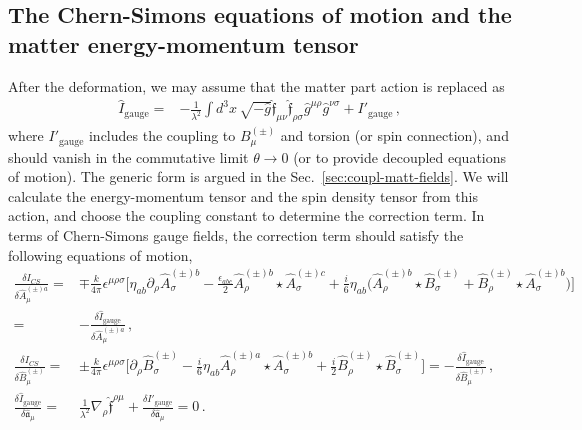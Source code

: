 \documentclass[11pt]{article}
\newcommand{\nn}{\nonumber}
\numberwithin{equation}{section}
\begin{document}
\subsection{The Chern-Simons equations of motion and the matter energy-momentum tensor}
\label{sec:matt-energy-moment}

After the deformation, we may assume that the matter part action is replaced as
\begin{align}
  \hat{I}_\text{gauge}=& 
-\frac{1}{\lambda^2} \int d^3 x\, \sqrt{-\hat{g}} \hat{\mathfrak{f}}_{\mu\nu} \hat{\mathfrak{f}}_{\rho\sigma} \hat{g}^{\mu\rho} \hat{g}^{\nu\sigma}
+ I'_\text{gauge} \,,
\end{align}
where $I'_\text{gauge}$ includes the coupling to $B_\mu^{(\pm)}$ and torsion (or spin connection),
and should vanish in the commutative limit $\theta \rightarrow 0$
(or to provide decoupled equations of motion).
The generic form is argued in the Sec.~\ref{sec:coupl-matt-fields}.
We will calculate the energy-momentum tensor and the spin density tensor from this action,
and choose the coupling constant to determine the correction term.
In terms of Chern-Simons gauge fields,
the correction term should satisfy the following equations of motion,
\begin{align}
    \frac{\delta I_{CS}}{\delta \hat{A}_\mu^{(\pm)a}}=&
\mp \frac{k}{4\pi} \epsilon^{\mu\rho\sigma}
\bigg[
\eta_{ab}\partial_\rho \hat{A}_\sigma^{(\pm)b}
-\frac{\epsilon_{abc}}{2}\hat{A}_\rho^{(\pm)b}  \star \hat{A}_\sigma^{(\pm)c}
+\frac{i}{6}\eta_{ab}\big( \hat{A}_\rho^{(\pm)b} \star \hat{B}_\sigma^{(\pm)} +
                                               \hat{B}_\rho^{(\pm)} \star \hat{A}_\sigma^{(\pm)b} \big)
 \bigg]
\nn\\=& -\frac{\delta \hat{I}_\text{gauge}}{\delta \hat{A}_\mu^{(\pm)a}} 
\label{eq:eqm_A_def0}
\,,\\
  \frac{\delta I_{CS}}{\delta \hat{B}_\mu^{(\pm)}}=&
\pm \frac{k}{4\pi} \epsilon^{\mu\rho\sigma} 
\bigg[
\partial_\rho \hat{B}_\sigma^{(\pm)}
-\frac{i}{6} \eta_{ab} \hat{A}_\rho^{(\pm)a} \star \hat{A}_\sigma^{(\pm)b}
+ \frac{i}{2}\hat{B}_\rho^{(\pm)} \star \hat{B}_\sigma^{(\pm)}
\bigg]=
-\frac{\delta \hat{I}_\text{gauge}}{\delta \hat{B}_\mu^{(\pm)}}
\label{eq:eqm_B_def0} \,,\\
\frac{\delta \hat{I}_\text{gauge}}{\delta \hat{\mathfrak{a}}_\mu}
=&  
\frac{1}{\lambda^2} \nabla_\rho \hat{\mathfrak{f}}^{\rho\mu} + \frac{\delta {I}'_\text{gauge}}{\delta \hat{\mathfrak{a}}_\mu}
=0\,.
\label{eq:eom_a}
\end{align}
\end{document}
